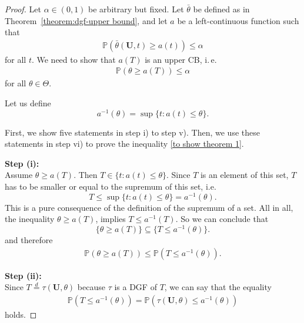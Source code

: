 \begin{proof}
	Let $\alpha \in (0, 1)$ be arbitrary but fixed. Let $\bar \theta$ be defined as in Theorem~\ref{theorem:dgf-upper bound}, and let $a$ be a left-continuous function such that
	\begin{align*}
		\mathbb{P} \left( \bar \theta (\mathbf U, t) \geq a(t) \right) \leq \alpha
	\end{align*}
	for all $t$.
	We need to show that $a(T)$ is an upper CB, i.\,e.\
	\begin{align} \label{to show theorem 1}
		\mathbb{P} \left( \theta \geq a(T) \right) \leq \alpha
	\end{align}
	for all $\theta \in \Theta$.
	
	Let us define
	\[
	a^{-1} (\theta ) = \sup \{ t : a(t) \leq \theta \}.
	\]
	
	First, we show five statements in step i) to step v). Then, we use these statements in step vi) to prove the inequality \eqref{to show theorem 1}.
	
	\textbf{Step (i):} \\	
	Assume $\theta \geq a(T)$. Then $T \in \{ t: a(t) \leq \theta \}$. Since $T$ is an element of this set, $T$ has to be smaller or equal to the supremum of this set, i.e. 
	\[
		T \leq \sup \{ t: a(t) \leq \theta \} = a^{-1}(\theta).
	\]
	This is a pure consequence of the definition of the supremum of a set. All in all, the inequality $\theta \geq a(T)$, implies $T \leq a^{-1}(T)$. 
	So we can conclude that
	\[
		\{ \theta \geq a(T) \} \subseteq \{ T \leq a^{-1}(\theta) \}.
	\]
	and therefore 
	\begin{align} \label{theorem 1: step i}
		\mathbb{P} \left( \theta \geq a(T) \right) \leq 
		\mathbb{P} \left( T \leq a^{-1} (\theta) \right).
	\end{align}	
	
	
	\textbf{Step (ii):} \\
	
	Since $T \overset{d}{=} \tau (\mathbf U, \theta)$ because $\tau$ is a DGF of $T$, we can say that the equality 
	\begin{align} \label{theorem 1: step ii}
		\mathbb{P} \left( T \leq a^{-1}(\theta) \right)
		=
		\mathbb{P} \left( \tau (\mathbf U, \theta) \leq a^{-1}(\theta) \right)
	\end{align}
	holds.
	

\end{proof}
